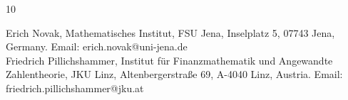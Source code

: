 \documentclass[12pt]{article}
\theoremstyle{remark}
\theoremstyle{definition}
\newcommand{\<}{\langle}
\renewcommand{\>}{\rangle}
\begin{document}
\begin{thebibliography}{10}


\end{thebibliography}


\noindent Erich Novak, Mathematisches Institut, FSU Jena, Inselplatz 5, 07743 Jena, Germany. Email: erich.novak@uni-jena.de\\

\noindent Friedrich Pillichshammer, Institut f\"{u}r Finanzmathematik und Angewandte Zahlentheorie, JKU Linz, Altenbergerstra{\ss}e 69, A-4040 Linz, Austria. Email: friedrich.pillichshammer@jku.at
\end{document}
